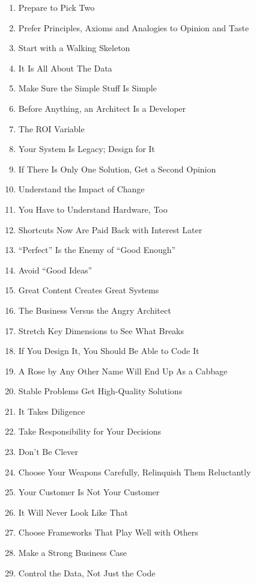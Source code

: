 \documentclass[10pt]{article}
\begin{document}
\begin{multicols}{4}
\begin{enumerate}
      \item Prepare to Pick Two 
      \item Prefer Principles, Axioms and Analogies to Opinion and Taste 
      \item Start with a Walking Skeleton 
      \item It Is All About The Data 
      \item Make Sure the Simple Stuff Is Simple 
      \item Before Anything, an Architect Is a Developer 
      \item The ROI Variable 
      \item Your System Is Legacy; Design for It 
      \item If There Is Only One Solution, Get a Second Opinion 
      \item Understand the Impact of Change 
      \item You Have to Understand Hardware, Too 
      \item Shortcuts Now Are Paid Back with Interest Later 
      \item “Perfect” Is the Enemy of ``Good Enough'' 
      \item Avoid ``Good Ideas'' 
      \item Great Content Creates Great Systems 
      \item The Business Versus the Angry Architect 
      \item Stretch Key Dimensions to See What Breaks 
      \item If You Design It, You Should Be Able to Code It 
      \item A Rose by Any Other Name Will End Up As a Cabbage 
      \item Stable Problems Get High-Quality Solutions 
      \item It Takes Diligence 
      \item Take Responsibility for Your Decisions 
      \item Don't Be Clever 
      \item Choose Your Weapons Carefully, Relinquish Them Reluctantly 
      \item Your Customer Is Not Your Customer 
      \item It Will Never Look Like That 
      \item Choose Frameworks That Play Well with Others 
      \item Make a Strong Business Case 
      \item Control the Data, Not Just the Code 

\end{enumerate}
\end{multicols}
\end{document}
